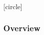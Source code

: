 \documentclass[10pt, aspectratio=169]{beamer}
\theoremstyle{remark}
\theoremstyle{definition}
\begin{document}
[circle]

\begin{frame}
	\frametitle{Overview} %
	\tableofcontents %
\end{frame}
\end{document}
